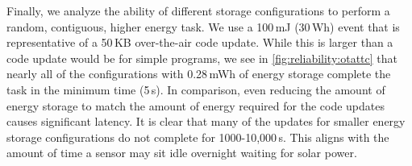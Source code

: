 Finally, we analyze the ability of different storage configurations to perform a
random, contiguous, higher energy task. We use a 100\,mJ (30\,\textmu Wh) event that is representative of a
50\,KB over-the-air code update. While this is larger than a code update would be
for simple programs,
we see in \cref{fig:reliability:otattc} that nearly all of the configurations with
0.28\,mWh of energy storage complete the task in the minimum time (5\,s). In comparison,
even reducing the amount of energy storage to match the amount of energy
required for the code updates causes significant latency. It is clear that
many of the updates for smaller energy storage configurations
do not complete for 1000-10,000\,s.
This aligns with the amount of time a sensor may sit
idle overnight waiting for solar power.

